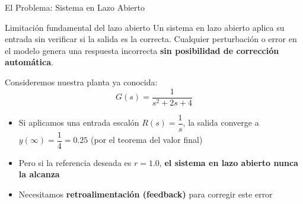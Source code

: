 \documentclass[aspectratio=169,xcolor=dvipsnames]{beamer}
\begin{document}
\begin{frame}{El Problema: Sistema en Lazo Abierto}
    \footnotesize
    \begin{alertblock}{Limitación fundamental del lazo abierto}
        Un sistema en lazo abierto aplica su entrada sin verificar si la salida es la correcta. Cualquier perturbación o error en el modelo genera una respuesta incorrecta \textbf{sin posibilidad de corrección automática}.
    \end{alertblock}
    \vspace{0.4em}
    Consideremos nuestra planta ya conocida:
    \begin{equation}
        G(s) = \frac{1}{s^2 + 2s + 4}
    \end{equation}
    \begin{itemize}
        \item Si aplicamos una entrada escalón $R(s) = \dfrac{1}{s}$, la salida converge a $y(\infty) = \dfrac{1}{4} = 0.25$ (por el teorema del valor final)
        \item Pero si la referencia deseada es $r = 1.0$, \textbf{el sistema en lazo abierto nunca la alcanza}
        \item Necesitamos \textbf{retroalimentación (feedback)} para corregir este error
    \end{itemize}
\end{frame}
\end{document}
